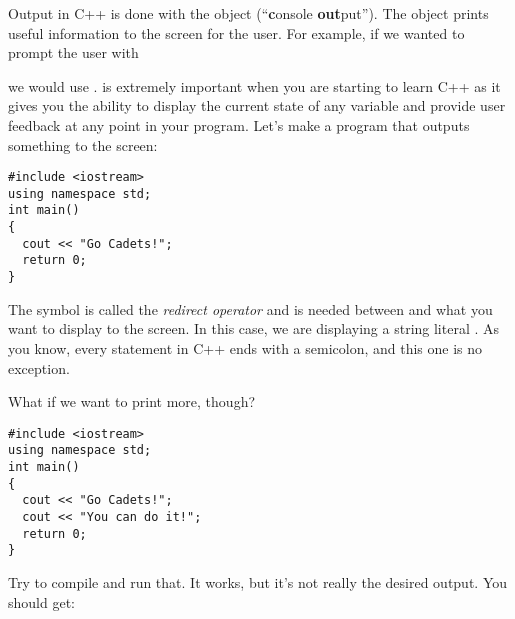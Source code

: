 
Output in C++ is done with the object  (``\textbf{c}onsole \textbf{out}put''). 
The object  prints useful information to the screen for the user. 
For example, if we wanted to prompt the user with 

\noindent {}

\noindent we would use . 
 is extremely important when you are starting to learn C++ as it gives you the ability to display the current state of any variable and provide user feedback at any point in your program. 
Let's make a program that outputs something to the screen:

\noindent\begin{minipage}{\linewidth}\begin{lstlisting}
#include <iostream>
using namespace std;
int main()
{
  cout << "Go Cadets!";
  return 0;
}
\end{lstlisting}\end{minipage}


The symbol \Code{<<} is called the \emph{redirect operator} and is needed between  and what you want to display to the screen. 
In this case, we are displaying a string literal . 
As you know, every statement in C++ ends with a semicolon, and this one is no exception.

What if we want to print more, though?

\noindent\begin{minipage}{\linewidth}\begin{lstlisting}
#include <iostream>
using namespace std;
int main()
{
  cout << "Go Cadets!";
  cout << "You can do it!";
  return 0;
}
\end{lstlisting}\end{minipage}

Try to compile and run that. 
It works, but it's not really the desired output. 
You should get:

\noindent {}

